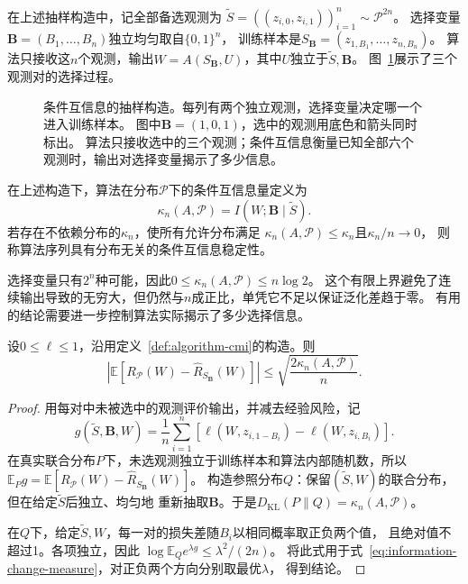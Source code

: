 在上述抽样构造中，记全部备选观测为
$\tilde S=((z_{i,0},z_{i,1}))_{i=1}^n\sim\mathcal P^{2n}$。
选择变量$\bm B=(B_1,\ldots,B_n)$独立均匀取自$\{0,1\}^n$，
训练样本是$S_{\bm B}=(z_{1,B_1},\ldots,z_{n,B_n})$。
算法只接收这$n$个观测，输出$W=A(S_{\bm B},U)$，其中$U$独立于$\tilde S,\bm B$。
图~\ref{fig:conditional-information}展示了三个观测对的选择过程。

\begin{figure}[htbp]
 \centering
 
 \caption{条件互信息的抽样构造。每列有两个独立观测，选择变量决定哪一个进入训练样本。
 图中$\bm B=(1,0,1)$，选中的观测用底色和箭头同时标出。
 算法只接收选中的三个观测；条件互信息衡量已知全部六个观测时，输出对选择变量揭示了多少信息。}
 \label{fig:conditional-information}
\end{figure}

\begin{definition}[算法的条件互信息量]
\label{def:algorithm-cmi}
在上述构造下，算法在分布$\mathcal P$下的条件互信息量定义为
\[
 \kappa_n(A,\mathcal P)=I(W;\bm B\mid\tilde S).
\]
若存在不依赖分布的$\kappa_n$，使所有允许分布满足
$\kappa_n(A,\mathcal P)\leq\kappa_n$且$\kappa_n/n\to0$，
则称算法序列具有分布无关的条件互信息稳定性。
\end{definition}

选择变量只有$2^n$种可能，因此$0\leq\kappa_n(A,\mathcal P)\leq n\log2$。
这个有限上界避免了连续输出导致的无穷大，但仍然与$n$成正比，单凭它不足以保证泛化差趋于零。
有用的结论需要进一步控制算法实际揭示了多少选择信息。

\begin{theorem}[条件互信息与期望风险]
\label{thm:conditional-information-risk}
设$0\leq\ell\leq1$，沿用定义~\ref{def:algorithm-cmi}的构造。则
\[
 \left|\mathbb E[R_{\mathcal P}(W)-\hat R_{S_{\bm B}}(W)]\right|
 \leq\sqrt{\frac{2\kappa_n(A,\mathcal P)}n}.
\]
\end{theorem}
\begin{proof}
用每对中未被选中的观测评价输出，并减去经验风险，记
\[
 g(\tilde S,\bm B,W)=\frac1n\sum_{i=1}^n
 [\ell(W,z_{i,1-B_i})-\ell(W,z_{i,B_i})].
\]
在真实联合分布$P$下，未选观测独立于训练样本和算法内部随机数，所以
$\mathbb E_Pg=\mathbb E[R_{\mathcal P}(W)-\hat R_{S_{\bm B}}(W)]$。
构造参照分布$Q$：保留$(\tilde S,W)$的联合分布，但在给定$\tilde S$后独立、均匀地
重新抽取$\bm B$。于是$D_{\mathrm{KL}}(P\|Q)=\kappa_n(A,\mathcal P)$。

在$Q$下，给定$\tilde S,W$，每一对的损失差随$B_i$以相同概率取正负两个值，
且绝对值不超过1。各项独立，因此
$\log\mathbb E_Q e^{\lambda g}\leq\lambda^2/(2n)$。
将此式用于式~\eqref{eq:information-change-measure}，对正负两个方向分别取最优$\lambda$，
得到结论。
\end{proof}

